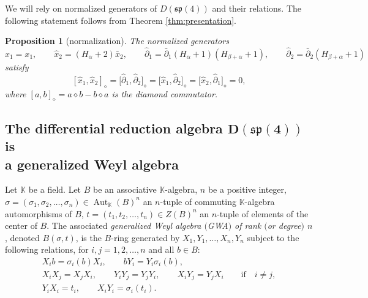 \documentclass[pdftex]{sigma}
\numberwithin{equation}{section}
\newtheorem{Proposition}[Theorem]{Proposition}
 { \theoremstyle{definition}
\newtheorem{Definition}[Theorem]{Definition}
\newtheorem{Note}[Theorem]{Note}
\newtheorem{Example}[Theorem]{Example}
\newtheorem{Remark}[Theorem]{Remark} }
\DeclareMathOperator{\Aut}{Aut}
\begin{document}
We will rely on normalized generators of $D(\mathfrak{sp}(4))$ and their relations. The following statement follows from Theorem \ref{thm:presentation}.
\begin{Proposition}[normalization]\label{Prop:Normalized-generators-relations}
	The normalized generators
	\[
		\hat x_1 = x_1,\qquad \hat x_2=(H_\alpha+2)\bar x_2,\qquad
		\hat \partial_1 = \bar \partial_1(H_\alpha+1)(H_{\beta+\alpha}+1),\qquad \hat \partial_2=\bar \partial_2(H_{\beta+\alpha}+1)
	\]
	satisfy
	\begin{equation}\label{eq:hat-relations}
		[\hat x_1,\hat x_2]_\diamond = \bigl[\hat \partial_1,\hat \partial_2\bigr]_\diamond =\bigl[\hat x_1, \hat \partial_2\bigr]_\diamond = \bigl[\hat x_2, \hat \partial_1\bigr]_\diamond=0,
	\end{equation}
	where $[a,b]_\diamond = a\diamond b-b\diamond a$ is the diamond commutator.
\end{Proposition}

\subsection[The differential reduction algebra D(sp(4)) is a generalized Weyl algebra]{The differential reduction algebra $\boldsymbol{D(\mathfrak{sp}(4))}$ is\\ a generalized Weyl algebra}\label{subsec:GWAsp4}
\begin{Definition}[GWA]\label{def:GWA}
	Let $\mathbb{K}$ be a field.
	Let $B$ be an associative $\mathbb{K}$-algebra, $n$ be a positive integer, $\sigma=(\sigma_1,\sigma_2,\dots,\sigma_n)\in\Aut_\mathbb{K}(B)^n$ an $n$-tuple of commuting $\mathbb{K}$-algebra automorphisms of $B$, $t=(t_1,t_2,\dots,t_n)\in Z(B)^n$ an $n$-tuple of elements of the center of $B$. The associated \emph{generalized Weyl algebra $($GWA$)$ of rank $($or degree$)$ $n$}, denoted $B(\sigma,t)$, is the $B$-ring generated by $X_1, Y_1, \dots, X_n, Y_n$ subject to the following relations, for $i,j=1,2,\dots,n$ and all $b\in B$:
	\begin{subequations}\label{eq:GWA-rels}
		\begin{gather}%
			\label{eq:GWA-rels1}
			X_ib=\sigma_i(b)X_i,\qquad bY_i=Y_i\sigma_i(b),\\
			\label{eq:GWA-rels2}
			X_iX_j=X_jX_i,\qquad Y_iY_j=Y_jY_i,\qquad
			X_iY_j=Y_jX_i \qquad\text{if}\quad i\neq j,\\
			Y_iX_i=t_i,\qquad X_iY_i=\sigma_i(t_i).\nonumber
		\end{gather}
	\end{subequations}
\end{Definition}
\end{document}
